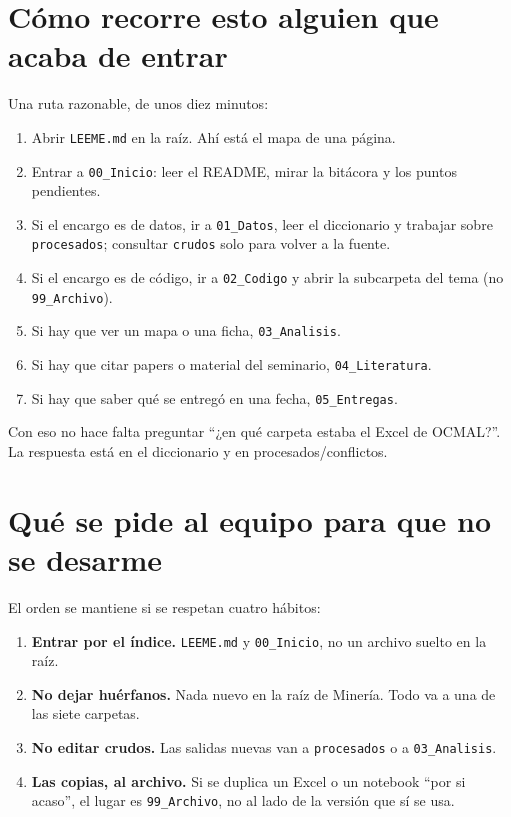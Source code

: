 \documentclass[11pt,a4paper]{article}
\begin{document}
\section{Cómo recorre esto alguien que acaba de entrar}

Una ruta razonable, de unos diez minutos:

\begin{enumerate}
  \item Abrir \texttt{LEEME.md} en la raíz. Ahí está el mapa de una página.
  \item Entrar a \texttt{00\_Inicio}: leer el README, mirar la bitácora y los puntos pendientes.
  \item Si el encargo es de datos, ir a \texttt{01\_Datos}, leer el diccionario y trabajar sobre \texttt{procesados}; consultar \texttt{crudos} solo para volver a la fuente.
  \item Si el encargo es de código, ir a \texttt{02\_Codigo} y abrir la subcarpeta del tema (no \texttt{99\_Archivo}).
  \item Si hay que ver un mapa o una ficha, \texttt{03\_Analisis}.
  \item Si hay que citar papers o material del seminario, \texttt{04\_Literatura}.
  \item Si hay que saber qué se entregó en una fecha, \texttt{05\_Entregas}.
\end{enumerate}

Con eso no hace falta preguntar ``¿en qué carpeta estaba el Excel de OCMAL?''. La respuesta está en el diccionario y en procesados/conflictos.

\section{Qué se pide al equipo para que no se desarme}

El orden se mantiene si se respetan cuatro hábitos:

\begin{enumerate}
  \item \textbf{Entrar por el índice.} \texttt{LEEME.md} y \texttt{00\_Inicio}, no un archivo suelto en la raíz.
  \item \textbf{No dejar huérfanos.} Nada nuevo en la raíz de Minería. Todo va a una de las siete carpetas.
  \item \textbf{No editar crudos.} Las salidas nuevas van a \texttt{procesados} o a \texttt{03\_Analisis}.
  \item \textbf{Las copias, al archivo.} Si se duplica un Excel o un notebook ``por si acaso'', el lugar es \texttt{99\_Archivo}, no al lado de la versión que sí se usa.
\end{enumerate}
\end{document}
